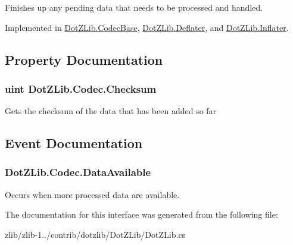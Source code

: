 Finishes up any pending data that needs to be processed and handled. 



Implemented in \hyperlink{class_dot_z_lib_1_1_codec_base_abab96cb01a9b983452a31777e3a1e633}{Dot\+Z\+Lib.\+Codec\+Base}, \hyperlink{class_dot_z_lib_1_1_deflater_a84507769a20a13c2ff48cfcef8f5c13b}{Dot\+Z\+Lib.\+Deflater}, and \hyperlink{class_dot_z_lib_1_1_inflater_aa70c9d026f5d1b44fe0679b78973285c}{Dot\+Z\+Lib.\+Inflater}.



\subsection{Property Documentation}
\hypertarget{interface_dot_z_lib_1_1_codec_aa5f968120138390af2648c956d4355cb}{
\subsubsection[{Checksum}]{\setlength{\rightskip}{0pt plus 5cm}uint Dot\+Z\+Lib.\+Codec.\+Checksum\hspace{0.3cm}{\ttfamily [get]}}}\label{interface_dot_z_lib_1_1_codec_aa5f968120138390af2648c956d4355cb}


Gets the checksum of the data that has been added so far 



\subsection{Event Documentation}
\hypertarget{interface_dot_z_lib_1_1_codec_a54b5cd5685e1256fcb0cb6ead5c3e5b5}{
\subsubsection[{Data\+Available}]{ Dot\+Z\+Lib.\+Codec.\+Data\+Available}}\label{interface_dot_z_lib_1_1_codec_a54b5cd5685e1256fcb0cb6ead5c3e5b5}


Occurs when more processed data are available. 



The documentation for this interface was generated from the following file\+:\begin{DoxyCompactItemize}
\item 
zlib/zlib-\/1../contrib/dotzlib/\+Dot\+Z\+Lib/Dot\+Z\+Lib.\+cs\end{DoxyCompactItemize}
